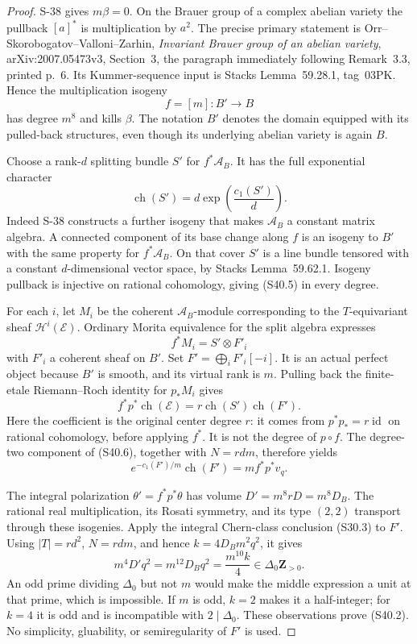 \documentclass[11pt,a4paper]{article}
\theoremstyle{definition}
\begin{document}
\begin{proof}
S-38 gives $m\beta=0$. On the Brauer group of a complex abelian
variety the pullback $[a]^*$ is multiplication by $a^2$.
The precise primary statement is Orr--Skorobogatov--Valloni--Zarhin,
\emph{Invariant Brauer group of an abelian variety},
arXiv:2007.05473v3, Section~3, the paragraph immediately following
Remark~3.3, printed p.~6. Its Kummer-sequence input is Stacks
Lemma~59.28.1, tag~03PK. Hence the multiplication isogeny
\[
 f=[m]:B'\longrightarrow B
 \tag{S40.4}
\]
has degree $m^8$ and kills $\beta$. The notation $B'$ denotes the
domain equipped with its pulled-back structures, even though its
underlying abelian variety is again $B$.

Choose a rank-$d$ splitting bundle $S'$ for
$f^*\mathscr A_B$. It has the full exponential character
\[
 \operatorname{ch}(S')=d\exp\!\left(\frac{c_1(S')}{d}\right).
 \tag{S40.5}
\]
Indeed S-38 constructs a further isogeny that makes $\mathscr A_B$
a constant matrix algebra. A connected component of its base
change along $f$ is an isogeny to $B'$ with the same property for
$f^*\mathscr A_B$. On that cover $S'$ is a line bundle tensored
with a constant $d$-dimensional vector space, by Stacks
Lemma~59.62.1. Isogeny pullback is injective on rational
cohomology, giving (S40.5) in every degree.

For each $i$, let $M_i$ be the coherent $\mathscr A_B$-module
corresponding to the $T$-equivariant sheaf
$\mathcal H^i(\mathcal E)$. Ordinary Morita equivalence for the
split algebra expresses
\[
 f^*M_i=S'\otimes F'_i
\]
with $F'_i$ a coherent sheaf on $B'$. Set
$F'=\bigoplus_i F'_i[-i]$. It is an actual perfect object because
$B'$ is smooth, and its virtual rank is $m$. Pulling back the
finite-etale Riemann--Roch identity for $p_*M_i$ gives
\[
 f^*p^*\operatorname{ch}(\mathcal E)
   =r\operatorname{ch}(S')\operatorname{ch}(F').
 \tag{S40.6}
\]
Here the coefficient is the original center degree $r$:
it comes from $p^*p_*=r\operatorname{id}$ on rational cohomology,
before applying $f^*$. It is not the degree of $p\circ f$.
The degree-two component of (S40.6), together with $N=rdm$,
therefore yields
\[
 e^{-c_1(F')/m}\operatorname{ch}(F')
    =m f^*p^*v_q.
 \tag{S40.7}
\]

The integral polarization $\theta'=f^*p^*\theta$ has volume
$D'=m^8rD=m^8D_B$. The rational real multiplication, its Rosati
symmetry, and its type $(2,2)$ transport through these isogenies.
Apply the integral Chern-class conclusion (S30.3) to $F'$.
Using $|T|=rd^2$, $N=rdm$, and hence
$k=4D_Bm^2q^2$, it gives
\[
 m^4D'q^2
   =m^{12}D_Bq^2
   =\frac{m^{10}k}{4}
   \in\Delta_0\mathbf Z_{>0}.
 \tag{S40.8}
\]
An odd prime dividing $\Delta_0$ but not $m$ would make the
middle expression a unit at that prime, which is impossible.
If $m$ is odd, $k=2$ makes it a half-integer; for $k=4$ it is
odd and is incompatible with $2\mid\Delta_0$. These observations
prove (S40.2). No simplicity, gluability, or semiregularity of
$F'$ is used.


\end{proof}
\end{document}
